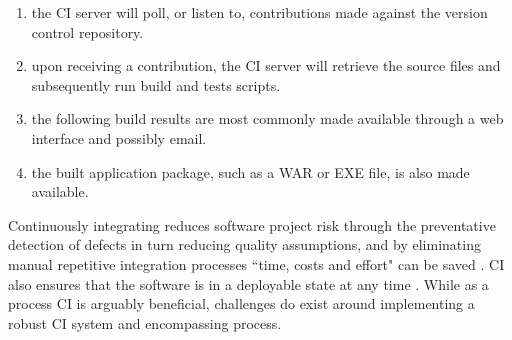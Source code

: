 \documentclass[journal]{IEEEtran}
\begin{document}
\begin{enumerate}  
\item the CI server will poll, or listen to, contributions 
made against the version control repository.
\item upon receiving a contribution, the CI 
server will retrieve the source files and subsequently run build and tests scripts. 
\item the following build results are most commonly made available through a web interface and possibly
email.
\item the built application package, such as a WAR or EXE file, is also made available.
\end{enumerate}
\par
Continuously integrating reduces software project risk through 
the preventative detection of defects in turn reducing quality 
assumptions, and by eliminating manual repetitive integration
processes ``time, costs and effort" can be saved \citep{Vas}.
CI also ensures that the software is in a deployable state at any time \citep{Jez}.
While as a process CI is arguably beneficial, challenges 
do exist around implementing a robust CI system 
and encompassing process.
\end{document}
